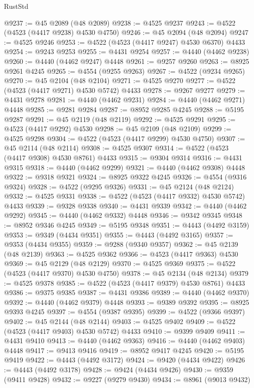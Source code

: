 \begin{lexlean}{RustStd}
\begin{coremodule}
@9237 := @45 @2089 (@48 @2089)
@9238 := @4525 @9237
@9243 := @4522 (@4523 (@4417 @9238) @4530 @4750)
@9246 := @45 @2094 (@48 @2094)
@9247 := @4525 @9246
@9253 := @4522 (@4523 (@4417 @9247) @4530 @6370) @4433
@9254 := @9243 @9253
@9255 := @4431 @9254
@9257 := @4440 (@4462 @9238)
@9260 := @4440 (@4462 @9247) @4448
@9261 := @9257 @9260
@9263 := @8925 @9261 @4245
@9265 := @4554 (@9255 @9263)
@9267 := @4522 (@9234 @9265)
@9270 := @45 @2104 (@48 @2104)
@9271 := @4525 @9270
@9277 := @4522 (@4523 (@4417 @9271) @4530 @5742) @4433
@9278 := @9267 @9277
@9279 := @4431 @9278
@9281 := @4440 (@4462 @9231)
@9284 := @4440 (@4462 @9271) @4448
@9285 := @9281 @9284
@9287 := @8952 @9285 @4245
@9288 := @5195 @9287
@9291 := @45 @2119 (@48 @2119)
@9292 := @4525 @9291
@9295 := @4523 (@4417 @9292) @4530
@9298 := @45 @2109 (@48 @2109)
@9299 := @4525 @9298
@9304 := @4522 (@4523 (@4417 @9299) @4530 @4750)
@9307 := @45 @2114 (@48 @2114)
@9308 := @4525 @9307
@9314 := @4522 (@4523 (@4417 @9308) @4530 @8761) @4433
@9315 := @9304 @9314
@9316 := @4431 @9315
@9318 := @4440 (@4462 @9299)
@9321 := @4440 (@4462 @9308) @4448
@9322 := @9318 @9321
@9324 := @8925 @9322 @4245
@9326 := @4554 (@9316 @9324)
@9328 := @4522 (@9295 @9326)
@9331 := @45 @2124 (@48 @2124)
@9332 := @4525 @9331
@9338 := @4522 (@4523 (@4417 @9332) @4530 @5742) @4433
@9339 := @9328 @9338
@9340 := @4431 @9339
@9342 := @4440 (@4462 @9292)
@9345 := @4440 (@4462 @9332) @4448
@9346 := @9342 @9345
@9348 := @8952 @9346 @4245
@9349 := @5195 @9348
@9351 := @4443 (@4492 @3159)
@9353 := @9349 (@4434 @9351)
@9355 := @4443 (@4492 @3165)
@9357 := @9353 (@4434 @9355)
@9359 := @9288 (@9340 @9357)
@9362 := @45 @2139 (@48 @2139)
@9363 := @4525 @9362
@9366 := @4523 (@4417 @9363) @4530
@9369 := @45 @2129 (@48 @2129)
@9370 := @4525 @9369
@9375 := @4522 (@4523 (@4417 @9370) @4530 @4750)
@9378 := @45 @2134 (@48 @2134)
@9379 := @4525 @9378
@9385 := @4522 (@4523 (@4417 @9379) @4530 @8761) @4433
@9386 := @9375 @9385
@9387 := @4431 @9386
@9389 := @4440 (@4462 @9370)
@9392 := @4440 (@4462 @9379) @4448
@9393 := @9389 @9392
@9395 := @8925 @9393 @4245
@9397 := @4554 (@9387 @9395)
@9399 := @4522 (@9366 @9397)
@9402 := @45 @2144 (@48 @2144)
@9403 := @4525 @9402
@9409 := @4522 (@4523 (@4417 @9403) @4530 @5742) @4433
@9410 := @9399 @9409
@9411 := @4431 @9410
@9413 := @4440 (@4462 @9363)
@9416 := @4440 (@4462 @9403) @4448
@9417 := @9413 @9416
@9419 := @8952 @9417 @4245
@9420 := @5195 @9419
@9422 := @4443 (@4492 @3172)
@9424 := @9420 (@4434 @9422)
@9426 := @4443 (@4492 @3178)
@9428 := @9424 (@4434 @9426)
@9430 := @9359 (@9411 @9428)
@9432 := @9227 (@9279 @9430)
@9434 := @8961 (@9013 @9432)

\end{coremodule}
\end{lexlean}
